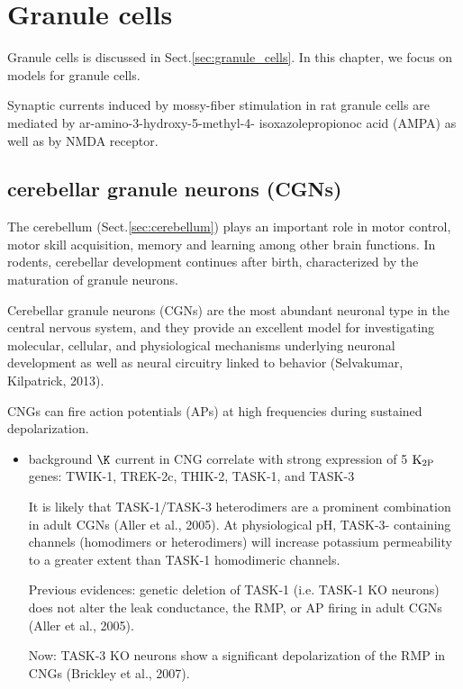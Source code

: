 \chapter{Granule cells}
\label{chap:granule-cell-models}

Granule cells is discussed in Sect.\ref{sec:granule_cells}.
In this chapter, we focus on models for granule cells.

Synaptic currents induced by mossy-fiber stimulation in rat
granule cells are mediated by ar-amino-3-hydroxy-5-methyl-4-
isoxazolepropionoc acid (AMPA) as well as by NMDA receptor.


\section{cerebellar granule neurons (CGNs)}
\label{sec:cerebellar-granule-neuron}
\label{sec:CGN}

The cerebellum (Sect.\ref{sec:cerebellum}) plays an important role in motor
control, motor skill acquisition, memory and learning among other brain
functions. In rodents, cerebellar development continues after birth,
characterized by the maturation of granule neurons.

Cerebellar granule neurons (CGNs) are the most abundant neuronal type in the
central nervous system, and they provide an excellent model  for investigating
molecular, cellular, and physiological mechanisms underlying neuronal
development as well as neural circuitry linked to behavior (Selvakumar,
Kilpatrick, 2013).

CNGs can fire action potentials (APs) at high frequencies during sustained
depolarization.
\begin{itemize}
  \item background $\K$ current in CNG correlate with strong expression of 5
  ${\text{K}_{\text{2P}}}$ genes: TWIK-1, TREK-2c, THIK-2, TASK-1, and TASK-3
  
  It is likely that TASK-1/TASK-3 heterodimers are a prominent combination
in adult CGNs (Aller et al., 2005).  At physiological pH, TASK-3- containing
channels (homodimers or heterodimers) will increase potassium permeability to a
greater extent than TASK-1 homodimeric channels. 

Previous evidences: genetic deletion of TASK-1 (i.e. TASK-1 KO neurons) does not
alter the leak conductance, the RMP, or AP firing in adult CGNs (Aller et al.,
2005).

Now: TASK-3 KO neurons show a significant depolarization of the RMP in CNGs
(Brickley et al., 2007).


\end{itemize}


